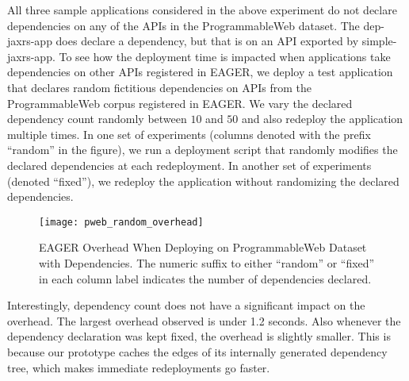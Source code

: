 All three sample applications considered in the above experiment do not declare dependencies on any of the APIs in the ProgrammableWeb
dataset. The dep-jaxrs-app does declare a dependency, but that is on an API exported by simple-jaxrs-app. To see how the deployment time is impacted
when applications take dependencies on other APIs registered in EAGER, we
deploy a test application that declares random fictitious dependencies on APIs
from the ProgrammableWeb corpus registered in EAGER. 
We vary the declared dependency count randomly between $10$ and $50$ 
and also redeploy the application multiple times.
In one set of experiments (columns denoted with the prefix ``random'' in the
figure), we run a deployment script that randomly modifies the 
declared dependencies at each redeployment. In another set of 
experiments (denoted ``fixed''), we redeploy the application 
without randomizing the declared dependencies.

\begin{figure}
\centering
\texttt{[image: pweb\_random\_overhead]}
\vspace{-0.01in}
\caption{EAGER Overhead When Deploying on ProgrammableWeb Dataset with
Dependencies. The numeric suffix to either ``random'' or ``fixed'' in each
column
label indicates the number of dependencies declared.}
\label{fig:pweb_random_overhead}
\end{figure}


Interestingly, dependency count does not have a significant impact on 
the overhead. %
The largest overhead observed is under 1.2 seconds.
Also whenever the dependency declaration was kept fixed, the overhead is slightly smaller. This is because our prototype caches
the edges of its internally generated dependency tree, 
which makes immediate redeployments go faster.

